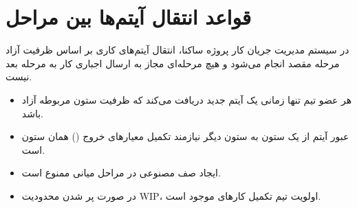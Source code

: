 

\section{قواعد انتقال آیتم‌ها بین مراحل}

در سیستم مدیریت جریان کار پروژه ساکنا، انتقال آیتم‌های کاری بر اساس ظرفیت آزاد مرحله مقصد انجام می‌شود و هیچ مرحله‌ای مجاز به ارسال اجباری کار به مرحله بعد نیست.


\begin{itemize}

\item هر عضو تیم تنها زمانی یک آیتم جدید دریافت می‌کند که ظرفیت ستون مربوطه آزاد باشد.

\item عبور آیتم از یک ستون به ستون دیگر نیازمند تکمیل معیارهای خروج () همان ستون است.

\item ایجاد صف مصنوعی در مراحل میانی ممنوع است.

\item در صورت پر شدن محدودیت WIP، اولویت تیم تکمیل کارهای موجود است.

\end{itemize}